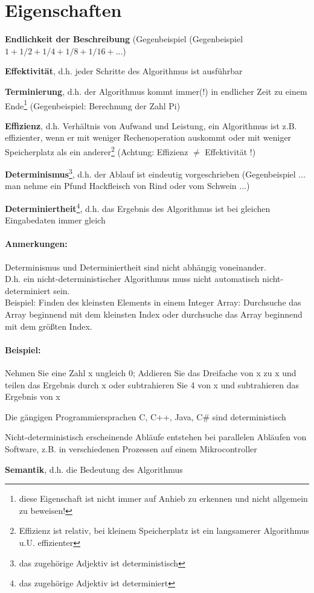 \section{Eigenschaften}
\begin{compactitem}
	\item {\bf Endlichkeit der Beschreibung} (Gegenbeispiel (Gegenbeispiel $1 + 1/2 + 1/4 + 1/8 + 1/16 + ...$)
	\item {\bf Effektivität}, d.h. jeder Schritte des Algorithmus ist ausführbar
	\item {\bf Terminierung}, d.h. der Algorithmus kommt immer(!) in endlicher Zeit zu einem Ende\footnote{diese Eigenschaft ist nicht immer auf Anhieb zu erkennen und nicht allgemein zu beweisen!} (Gegenbeispiel: Berechnung der Zahl Pi)
	\item {\bf Effizienz}, d.h. Verhältnis von Aufwand und Leistung, ein Algorithmus ist z.B. effizienter, wenn er mit weniger Rechenoperation auskommt oder mit weniger Speicherplatz als ein anderer\footnote{Effizienz ist {\flqq relativ\frqq}, bei kleinem Speicherplatz ist ein langsamerer Algorithmus u.U. effizienter} (Achtung: Effizienz $\ne$ Effektivität !)
	\item {\bf Determinismus}\footnote{das zugehörige Adjektiv ist deterministisch}, d.h. der Ablauf ist eindeutig vorgeschrieben (Gegenbeispiel {\flqq ... man nehme ein Pfund Hackfleisch von Rind oder vom Schwein ...\frqq})
	\item {\bf Determiniertheit}\footnote{das zugehörige Adjektiv ist determiniert}, d.h. das Ergebnis des Algorithmus ist bei gleichen Eingabedaten immer gleich
	\paragraph{Anmerkungen:}
	\begin{compactenum}
		\item Determinismus und Determiniertheit sind nicht abhängig voneinander.\\
		D.h. ein nicht-deterministischer Algorithmus muss nicht automatisch nicht-determiniert sein.\\
		Beispiel: Finden des kleinsten Elements in einem Integer Array: Durchsuche das Array beginnend mit dem kleinsten Index oder durchsuche das Array beginnend mit dem größten Index.\\
		\paragraph{Beispiel:} Nehmen Sie eine Zahl x ungleich 0; Addieren Sie das Dreifache von x zu x und teilen das Ergebnis durch x oder subtrahieren Sie 4 von x und subtrahieren das Ergebnis von x
		\item Die gängigen Programmiersprachen C, C++, Java, C\# sind deterministisch
		\item Nicht-deterministisch erscheinende Abläufe entstehen bei parallelen Abläufen von Software, z.B. in verschiedenen Prozessen auf einem Mikrocontroller
	\end{compactenum}
	\item {\bf Semantik}, d.h. die Bedeutung des Algorithmus

\end{compactitem}
